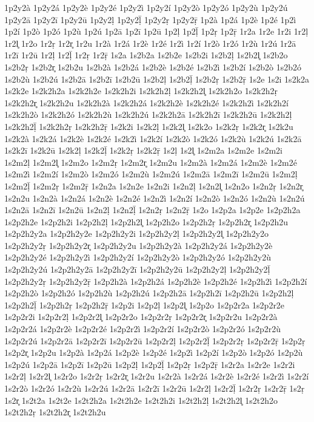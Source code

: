 {1p2y2à
1p2y2á
1p2y2è
1p2y2é
1p2y2ì
1p2y2í
1p2y2ò
1p2y2ó
1p2y2ù
1p2y2ú
1p2y2ā
1p2y2ī
1p2y2ū
1p2y2ḷ
1p2y2ḹ
1p2y2ṛ
1p2y2ṝ
1p2à
1p2á
1p2è
1p2é
1p2ì
1p2í
1p2ò
1p2ó
1p2ù
1p2ú
1p2ā
1p2ī
1p2ū
1p2ḷ
1p2ḹ
1p2ṛ
1p2ṝ
1r2a
1r2e
1r2i
1r2ḷ
1r2l̥
1r2o
1r2ṛ
1r2r̥
1r2u
1r2à
1r2á
1r2è
1r2é
1r2ì
1r2í
1r2ò
1r2ó
1r2ù
1r2ú
1r2ā
1r2ī
1r2ū
1r2ḷ
1r2ḹ
1r2ṛ
1r2ṝ
1s2a
1s2b2a
1s2b2e
1s2b2i
1s2b2ḷ
1s2b2l̥
1s2b2o
1s2b2ṛ
1s2b2r̥
1s2b2u
1s2b2à
1s2b2á
1s2b2è
1s2b2é
1s2b2ì
1s2b2í
1s2b2ò
1s2b2ó
1s2b2ù
1s2b2ú
1s2b2ā
1s2b2ī
1s2b2ū
1s2b2ḷ
1s2b2ḹ
1s2b2ṛ
1s2b2ṝ
1s2e
1s2i
1s2k2a
1s2k2e
1s2k2h2a
1s2k2h2e
1s2k2h2i
1s2k2h2ḷ
1s2k2h2l̥
1s2k2h2o
1s2k2h2ṛ
1s2k2h2r̥
1s2k2h2u
1s2k2h2à
1s2k2h2á
1s2k2h2è
1s2k2h2é
1s2k2h2ì
1s2k2h2í
1s2k2h2ò
1s2k2h2ó
1s2k2h2ù
1s2k2h2ú
1s2k2h2ā
1s2k2h2ī
1s2k2h2ū
1s2k2h2ḷ
1s2k2h2ḹ
1s2k2h2ṛ
1s2k2h2ṝ
1s2k2i
1s2k2ḷ
1s2k2l̥
1s2k2o
1s2k2ṛ
1s2k2r̥
1s2k2u
1s2k2à
1s2k2á
1s2k2è
1s2k2é
1s2k2ì
1s2k2í
1s2k2ò
1s2k2ó
1s2k2ù
1s2k2ú
1s2k2ā
1s2k2ī
1s2k2ū
1s2k2ḷ
1s2k2ḹ
1s2k2ṛ
1s2k2ṝ
1s2ḷ
1s2l̥
1s2m2a
1s2m2e
1s2m2i
1s2m2ḷ
1s2m2l̥
1s2m2o
1s2m2ṛ
1s2m2r̥
1s2m2u
1s2m2à
1s2m2á
1s2m2è
1s2m2é
1s2m2ì
1s2m2í
1s2m2ò
1s2m2ó
1s2m2ù
1s2m2ú
1s2m2ā
1s2m2ī
1s2m2ū
1s2m2ḷ
1s2m2ḹ
1s2m2ṛ
1s2m2ṝ
1s2n2a
1s2n2e
1s2n2i
1s2n2ḷ
1s2n2l̥
1s2n2o
1s2n2ṛ
1s2n2r̥
1s2n2u
1s2n2à
1s2n2á
1s2n2è
1s2n2é
1s2n2ì
1s2n2í
1s2n2ò
1s2n2ó
1s2n2ù
1s2n2ú
1s2n2ā
1s2n2ī
1s2n2ū
1s2n2ḷ
1s2n2ḹ
1s2n2ṛ
1s2n2ṝ
1s2o
1s2p2a
1s2p2e
1s2p2h2a
1s2p2h2e
1s2p2h2i
1s2p2h2ḷ
1s2p2h2l̥
1s2p2h2o
1s2p2h2ṛ
1s2p2h2r̥
1s2p2h2u
1s2p2h2y2a
1s2p2h2y2e
1s2p2h2y2i
1s2p2h2y2ḷ
1s2p2h2y2l̥
1s2p2h2y2o
1s2p2h2y2ṛ
1s2p2h2y2r̥
1s2p2h2y2u
1s2p2h2y2à
1s2p2h2y2á
1s2p2h2y2è
1s2p2h2y2é
1s2p2h2y2ì
1s2p2h2y2í
1s2p2h2y2ò
1s2p2h2y2ó
1s2p2h2y2ù
1s2p2h2y2ú
1s2p2h2y2ā
1s2p2h2y2ī
1s2p2h2y2ū
1s2p2h2y2ḷ
1s2p2h2y2ḹ
1s2p2h2y2ṛ
1s2p2h2y2ṝ
1s2p2h2à
1s2p2h2á
1s2p2h2è
1s2p2h2é
1s2p2h2ì
1s2p2h2í
1s2p2h2ò
1s2p2h2ó
1s2p2h2ù
1s2p2h2ú
1s2p2h2ā
1s2p2h2ī
1s2p2h2ū
1s2p2h2ḷ
1s2p2h2ḹ
1s2p2h2ṛ
1s2p2h2ṝ
1s2p2i
1s2p2ḷ
1s2p2l̥
1s2p2o
1s2p2r2a
1s2p2r2e
1s2p2r2i
1s2p2r2ḷ
1s2p2r2l̥
1s2p2r2o
1s2p2r2ṛ
1s2p2r2r̥
1s2p2r2u
1s2p2r2à
1s2p2r2á
1s2p2r2è
1s2p2r2é
1s2p2r2ì
1s2p2r2í
1s2p2r2ò
1s2p2r2ó
1s2p2r2ù
1s2p2r2ú
1s2p2r2ā
1s2p2r2ī
1s2p2r2ū
1s2p2r2ḷ
1s2p2r2ḹ
1s2p2r2ṛ
1s2p2r2ṝ
1s2p2ṛ
1s2p2r̥
1s2p2u
1s2p2à
1s2p2á
1s2p2è
1s2p2é
1s2p2ì
1s2p2í
1s2p2ò
1s2p2ó
1s2p2ù
1s2p2ú
1s2p2ā
1s2p2ī
1s2p2ū
1s2p2ḷ
1s2p2ḹ
1s2p2ṛ
1s2p2ṝ
1s2r2a
1s2r2e
1s2r2i
1s2r2ḷ
1s2r2l̥
1s2r2o
1s2r2ṛ
1s2r2r̥
1s2r2u
1s2r2à
1s2r2á
1s2r2è
1s2r2é
1s2r2ì
1s2r2í
1s2r2ò
1s2r2ó
1s2r2ù
1s2r2ú
1s2r2ā
1s2r2ī
1s2r2ū
1s2r2ḷ
1s2r2ḹ
1s2r2ṛ
1s2r2ṝ
1s2ṛ
1s2r̥
1s2t2a
1s2t2e
1s2t2h2a
1s2t2h2e
1s2t2h2i
1s2t2h2ḷ
1s2t2h2l̥
1s2t2h2o
1s2t2h2ṛ
1s2t2h2r̥
1s2t2h2u
}
